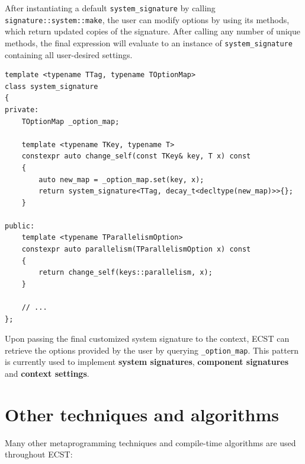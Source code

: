 \documentclass[twoside, 12pt, a4paper, openany]{book}
\begin{document}
After instantiating a default
\texttt{system_signature}
by calling
\texttt{signature::system::make},
the user can modify options by using its methods, which return updated
copies of the signature. After calling any number of unique methods, the
final expression will evaluate to an instance of
\texttt{system_signature}
containing all user-desired settings.

\begin{verbatim}
template <typename TTag, typename TOptionMap>
class system_signature
{
private:
    TOptionMap _option_map;

    template <typename TKey, typename T>
    constexpr auto change_self(const TKey& key, T x) const
    {
        auto new_map = _option_map.set(key, x);
        return system_signature<TTag, decay_t<decltype(new_map)>>{};
    }

public:
    template <typename TParallelismOption>
    constexpr auto parallelism(TParallelismOption x) const
    {
        return change_self(keys::parallelism, x);
    }

    // ...
};
\end{verbatim}

Upon passing the final customized system signature to the context, ECST
can retrieve the options provided by the user by querying
\texttt{_option_map}.
This pattern is currently used to implement \textbf{system signatures},
\textbf{component signatures} and \textbf{context settings}.

\section{Other techniques and
algorithms}\label{other-techniques-and-algorithms}

Many other metaprogramming techniques and compile-time algorithms are
used throughout ECST:
\end{document}
